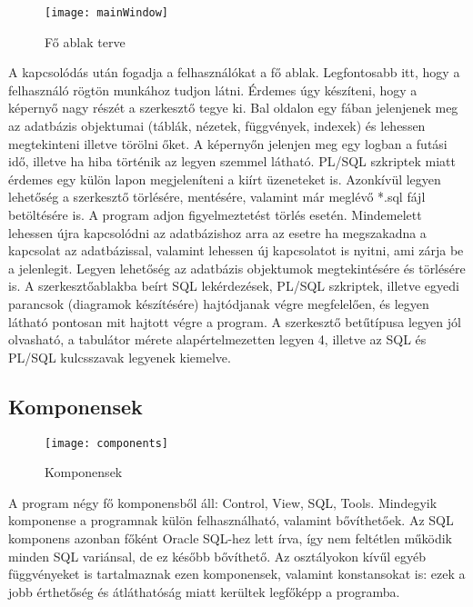 \begin{figure}[ht]
  \begin{center}
  \texttt{[image: mainWindow]}
  \end{center}
 \caption{Fő ablak terve}
\end{figure}

A kapcsolódás után fogadja a felhasználókat a fő ablak. Legfontosabb itt, hogy a felhasználó rögtön munkához tudjon látni.
Érdemes úgy készíteni, hogy a képernyő nagy részét a szerkesztő tegye ki. Bal oldalon egy fában jelenjenek meg az adatbázis objektumai
(táblák, nézetek, függvények, indexek) és lehessen megtekinteni illetve törölni őket. A képernyőn jelenjen meg egy logban a futási idő,
illetve ha hiba történik az legyen szemmel látható. PL/SQL szkriptek miatt érdemes egy külön lapon megjeleníteni a kiírt üzeneteket is.
Azonkívül legyen lehetőség a szerkesztő törlésére, mentésére, valamint már meglévő *.sql fájl betöltésére is. A program adjon figyelmeztetést
törlés esetén. Mindemelett lehessen újra kapcsolódni az adatbázishoz arra az esetre ha megszakadna a kapcsolat az adatbázissal, valamint
lehessen új kapcsolatot is nyitni, ami zárja be a jelenlegit. Legyen lehetőség az adatbázis objektumok megtekintésére és törlésére is.
A szerkesztőablakba beírt SQL lekérdezések, PL/SQL szkriptek, illetve egyedi parancsok (diagramok készítésére) hajtódjanak végre megfelelően,
és legyen látható pontosan mit hajtott végre a program. A szerkesztő betűtípusa legyen jól olvasható, a tabulátor mérete alapértelmezetten legyen
4, illetve az SQL és PL/SQL kulcsszavak legyenek kiemelve.

\subsection{Komponensek}

\begin{figure}[ht]
  \begin{center}
  \texttt{[image: components]}
  \end{center}
 \caption{Komponensek}
\end{figure}

A program négy fő komponensből áll: Control, View, SQL, Tools. Mindegyik komponense a programnak külön felhasználható,
valamint bővíthetőek. Az SQL komponens azonban főként Oracle SQL-hez lett írva, így nem feltétlen működik minden
SQL variánsal, de ez később bővíthető. Az osztályokon kívűl egyéb függvényeket is tartalmaznak ezen komponensek, valamint
konstansokat is: ezek a jobb érthetőség és átláthatóság miatt kerültek legfőképp a programba.

